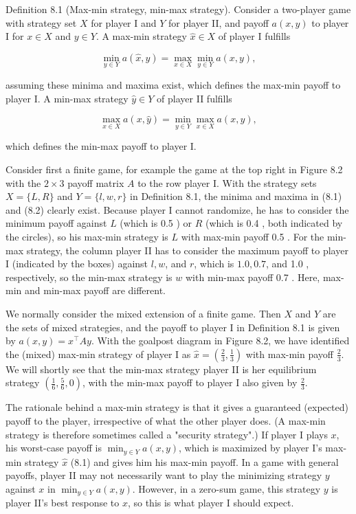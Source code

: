 \documentclass[12pt]{article}
\begin{document}
Definition 8.1 (Max-min strategy, min-max strategy). Consider a two-player game with strategy set $X$ for player I and $Y$ for player II, and payoff $a(x, y)$ to player I for $x \in X$ and $y \in Y$. A max-min strategy $\hat{x} \in X$ of player I fulfills


\begin{equation*}
\min _{y \in Y} a(\hat{x}, y)=\max _{x \in X} \min _{y \in Y} a(x, y), \tag{8.1}
\end{equation*}


assuming these minima and maxima exist, which defines the max-min payoff to player I. A min-max strategy $\hat{y} \in Y$ of player II fulfills


\begin{equation*}
\max _{x \in X} a(x, \hat{y})=\min _{y \in Y} \max _{x \in X} a(x, y), \tag{8.2}
\end{equation*}


which defines the min-max payoff to player I.

Consider first a finite game, for example the game at the top right in Figure 8.2 with the $2 \times 3$ payoff matrix $A$ to the row player I. With the strategy sets $X=\{L, R\}$ and $Y=\{l, w, r\}$ in Definition 8.1, the minima and maxima in (8.1) and (8.2) clearly exist. Because player I cannot randomize, he has to consider the minimum payoff against $L$ (which is 0.5 ) or $R$ (which is 0.4 , both indicated by the circles), so his max-min strategy is $L$ with max-min payoff 0.5 . For the min-max strategy, the column player II has to consider the maximum payoff to player I (indicated by the boxes) against $l, w$, and $r$, which is $1.0,0.7$, and 1.0 , respectively, so the min-max strategy is $w$ with min-max payoff 0.7 . Here, max-min and min-max payoff are different.

We normally consider the mixed extension of a finite game. Then $X$ and $Y$ are the sets of mixed strategies, and the payoff to player I in Definition 8.1 is given by $a(x, y)=x^{\top} A y$. With the goalpost diagram in Figure 8.2, we have identified the (mixed) max-min strategy of player I as $\hat{x}=\left(\frac{2}{3}, \frac{1}{3}\right)$ with max-min payoff $\frac{2}{3}$. We will shortly see that the min-max strategy player II is her equilibrium strategy $\left(\frac{1}{6}, \frac{5}{6}, 0\right)$, with the min-max payoff to player I also given by $\frac{2}{3}$.

The rationale behind a max-min strategy is that it gives a guaranteed (expected) payoff to the player, irrespective of what the other player does. (A max-min strategy is therefore sometimes called a "security strategy".) If player I plays $x$, his worst-case payoff is $\min _{y \in Y} a(x, y)$, which is maximized by player I's max-min strategy $\hat{x}$ (8.1) and gives him his max-min payoff. In a game with general payoffs, player II may not necessarily want to play the minimizing strategy $y$ against $x$ in $\min _{y \in Y} a(x, y)$. However, in a zero-sum game, this strategy $y$ is player II's best response to $x$, so this is what player I should expect.
\end{document}
